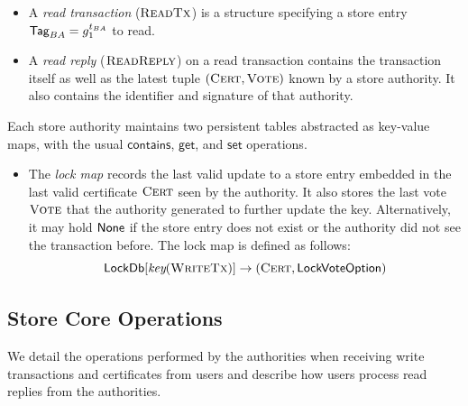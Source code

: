 \begin{itemize}
    \item A \emph{read transaction} ($\textsc{ReadTx}$) is a structure specifying a store entry $\textsf{Tag}_{BA} = g_1^{t_{BA}}$ to read.

    \item A \emph{read reply} ($\textsc{ReadReply}$) on a read transaction contains the transaction itself as well as the latest tuple $(\textsc{Cert}, \textsc{Vote})$ known by a store authority. It also contains the identifier and signature of that authority.
\end{itemize}

Each store authority maintains two persistent tables abstracted as key-value maps, with the usual $\mathsf{contains}$, $\mathsf{get}$, and $\mathsf{set}$ operations.

\begin{itemize}
    \item The \emph{lock map} records the last valid update to a store entry embedded in the last valid certificate $\textsc{Cert}$ seen by the authority. It also stores the last vote $\textsc{Vote}$ that the authority generated to further update the key. Alternatively, it may hold $\textsf{None}$ if the store entry does not exist or the authority did not see the transaction before. The lock map is defined as follows:
          $$\textsf{LockDb}[\emph{key}(\textsc{WriteTx})] \rightarrow (\textsc{Cert}, \textsf{LockVote} \textsf{Option})$$
\end{itemize}


\subsection{Store Core Operations} \label{sec:store-operations}
We detail the operations performed by the authorities when receiving write transactions and certificates from users and describe how users process read replies from the authorities.

